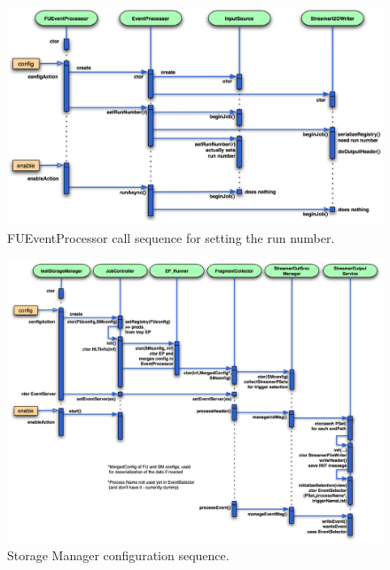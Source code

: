 \begin{figure}[hbtp]
  \begin{center}
    \includegraphics[width=5.5in]{SM_base_code1_prt-2.eps}
    \caption{FUEventProcessor call sequence for setting the run number.}
    \label{fig:base_FUEP_code}
  \end{center}
\end{figure}

\begin{figure}[hbtp]
  \begin{center}
    \includegraphics[width=5.5in]{SM_base_code2_prt-2.eps}
    \caption{Storage Manager configuration sequence.}
    \label{fig:base_SMCF_code}
  \end{center}
\end{figure}

